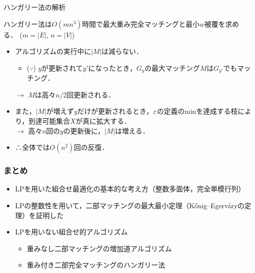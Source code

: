 \documentclass[14pt,aspectratio=169,xcolor=dvipsnames,table,onlytextwidth,dvipdfmx]{beamer}
\begin{document}
\begin{frame}{ハンガリー法の解析}

    \small
    \begin{theorem}
        ハンガリー法は$O(mn^3)$時間で最大重み完全マッチングと最小$w$被覆を求める．
        \hfill {\footnotesize ($m = |E|$, $n = |V|$)}
    \end{theorem}

    \pause
    \begin{itemize}[<+->]
        \item アルゴリズムの実行中に$|M|$は減らない．
        \begin{itemize}
            \item ($\because$) $y$が更新されて$y'$になったとき，$G_y$の最大マッチング$M$は$G_{y'}$でもマッチング．
        \end{itemize}
        $\longrightarrow$ $M$は高々$n/2$回更新される．

        \item また，$|M|$が増えず$y$だけが更新されるとき，$\varepsilon$の定義のminを達成する枝により，到達可能集合$X$が真に拡大する．\\
        $\longrightarrow$ 高々$n$回の$y$の更新後に，$|M|$は増える．

        \item ∴全体では$O(n^2)$回の反復．
    \end{itemize}

    \vfill
\end{frame}

\begin{frame}
    \frametitle{まとめ}

    \begin{itemize}
        \setlength{\itemsep}{1em}
        \item LPを用いた組合せ最適化の基本的な考え方（整数多面体，完全単模行列）

        \item LPの整数性を用いて，二部マッチングの最大最小定理（K\H{o}nig--Egerv\'aryの定理）を証明した

        \item LPを用いない組合せ的アルゴリズム
        \begin{itemize}
            \item 重みなし二部マッチングの増加道アルゴリズム
            \item 重み付き二部完全マッチングのハンガリー法
        \end{itemize}
    \end{itemize}
    
\end{frame}
\end{document}
